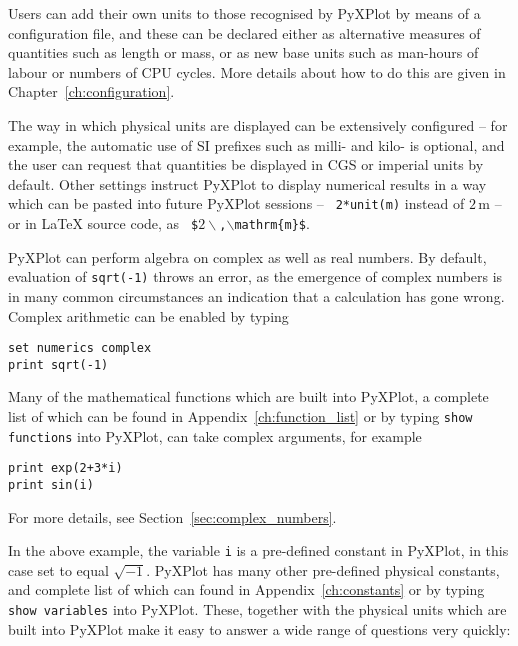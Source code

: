 Users can add their own units to those recognised by PyXPlot by means of a
configuration file, and these can be declared either as alternative measures of
quantities such as length or mass, or as new base units such as man-hours of
labour or numbers of CPU cycles. More details about how to do this are given in
Chapter~\ref{ch:configuration}.

The way in which physical units are displayed can be extensively configured --
for example, the automatic use of SI prefixes such as milli- and kilo- is
optional, and the user can request that quantities be displayed in CGS or
imperial units by default. Other settings instruct PyXPlot to display numerical
results in a way which can be pasted into future PyXPlot sessions -- {\tt
2*unit(m)} instead of $2\,\mathrm{m}$ -- or in LaTeX source code, as {\tt
\$$2\backslash$,$\backslash$mathrm\{m\}\$}.

PyXPlot can perform algebra on complex as well as real numbers. By default,
evaluation of {\tt sqrt(-1)} throws an error, as the emergence of complex
numbers is in many common circumstances an indication that a calculation has
gone wrong.  Complex arithmetic can be enabled by typing

\begin{verbatim}
set numerics complex
print sqrt(-1)
\end{verbatim}

\noindent Many of the mathematical functions which are built into PyXPlot, a
complete list of which can be found in Appendix~\ref{ch:function_list} or by
typing {\tt show functions} into PyXPlot, can take complex arguments, for
example

\begin{verbatim}
print exp(2+3*i)
print sin(i)
\end{verbatim}

\noindent For more details, see Section~\ref{sec:complex_numbers}.

In the above example, the variable {\tt i} is a pre-defined constant in
PyXPlot, in this case set to equal $\sqrt{-1}$. PyXPlot has many other
pre-defined physical constants, and complete list of which can found in
Appendix~\ref{ch:constants} or by typing {\tt show variables} into PyXPlot.
These, together with the physical units which are built into PyXPlot make it
easy to answer a wide range of questions very quickly:

